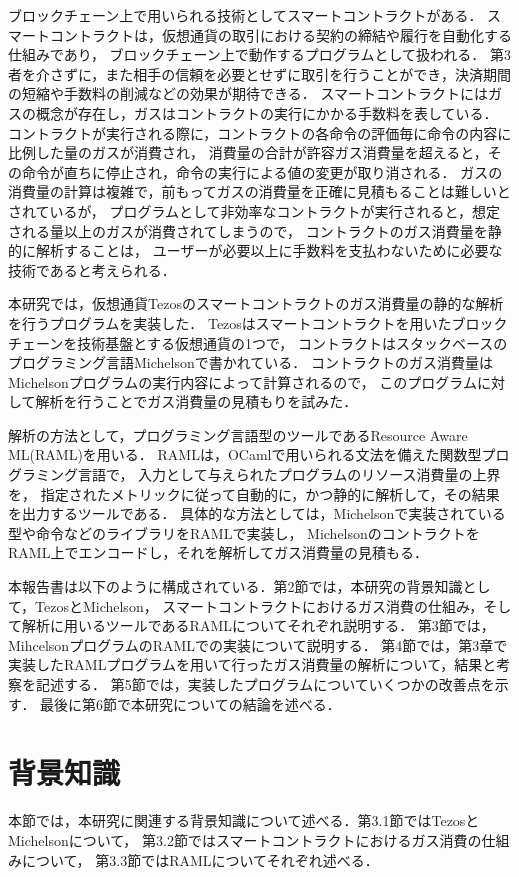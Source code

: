 \documentclass{kuisthesis}
\begin{document}
ブロックチェーン上で用いられる技術としてスマートコントラクトがある．
スマートコントラクトは，仮想通貨の取引における契約の締結や履行を自動化する仕組みであり，
ブロックチェーン上で動作するプログラムとして扱われる．
第3者を介さずに，また相手の信頼を必要とせずに取引を行うことができ，決済期間の短縮や手数料の削減などの効果が期待できる．
スマートコントラクトにはガスの概念が存在し，ガスはコントラクトの実行にかかる手数料を表している．
コントラクトが実行される際に，コントラクトの各命令の評価毎に命令の内容に比例した量のガスが消費され，
消費量の合計が許容ガス消費量を超えると，その命令が直ちに停止され，命令の実行による値の変更が取り消される．
ガスの消費量の計算は複雑で，前もってガスの消費量を正確に見積もることは難しいとされているが，
プログラムとして非効率なコントラクトが実行されると，想定される量以上のガスが消費されてしまうので，
コントラクトのガス消費量を静的に解析することは，
ユーザーが必要以上に手数料を支払わないために必要な技術であると考えられる．

本研究では，仮想通貨Tezosのスマートコントラクトのガス消費量の静的な解析を行うプログラムを実装した．
Tezosはスマートコントラクトを用いたブロックチェーンを技術基盤とする仮想通貨の1つで，
コントラクトはスタックベースのプログラミング言語Michelsonで書かれている．
コントラクトのガス消費量はMichelsonプログラムの実行内容によって計算されるので，
このプログラムに対して解析を行うことでガス消費量の見積もりを試みた．

解析の方法として，プログラミング言語型のツールであるResource Aware ML(RAML)を用いる．
RAMLは，OCamlで用いられる文法を備えた関数型プログラミング言語で，
入力として与えられたプログラムのリソース消費量の上界を，
指定されたメトリックに従って自動的に，かつ静的に解析して，その結果を出力するツールである．
具体的な方法としては，Michelsonで実装されている型や命令などのライブラリをRAMLで実装し，
MichelsonのコントラクトをRAML上でエンコードし，それを解析してガス消費量の見積もる．

本報告書は以下のように構成されている．第2節では，本研究の背景知識として，TezosとMichelson，
スマートコントラクトにおけるガス消費の仕組み，そして解析に用いるツールであるRAMLについてそれぞれ説明する．
第3節では，MihcelsonプログラムのRAMLでの実装について説明する．
第4節では，第3章で実装したRAMLプログラムを用いて行ったガス消費量の解析について，結果と考察を記述する．
第5節では，実装したプログラムについていくつかの改善点を示す．
最後に第6節で本研究についての結論を述べる．


\section{背景知識}\label{sec-preliminary}
本節では，本研究に関連する背景知識について述べる．第3.1節ではTezosとMichelsonについて，
第3.2節ではスマートコントラクトにおけるガス消費の仕組みについて，
第3.3節ではRAMLについてそれぞれ述べる．
\end{document}
